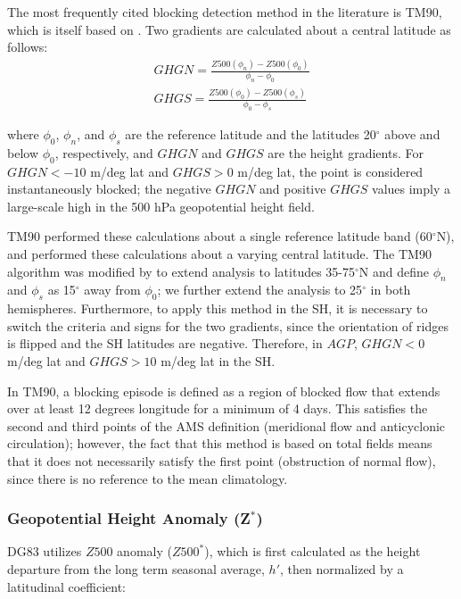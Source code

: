 \documentclass[smallextended]{svjour3}       %
\numberwithin{equation}{section}
\begin{document}
The most frequently cited blocking detection method in the literature is TM90, which is itself based on \cite{lejenas_characteristics_1983}. Two gradients are calculated about a central latitude as follows:
\begin{eqnarray}
GHGN=\frac{Z500(\phi_n)-Z500(\phi_0)}{\phi_n-\phi_0}\\
GHGS=\frac{Z500(\phi_0)-Z500(\phi_s)}{\phi_0-\phi_s}
\end{eqnarray}

\noindent
where $\phi_0$, $\phi_n$, and $\phi_s$ are the reference latitude and the latitudes 20$^\circ$ above and below $\phi_0$, respectively, and $GHGN$ and $GHGS$ are the height gradients. For $GHGN<-10$ m/deg lat and $GHGS>0$ m/deg lat, the point is considered instantaneously blocked; the negative $GHGN$ and positive $GHGS$ values imply a large-scale high in the 500 hPa geopotential height field.

TM90 performed these calculations about a single reference latitude band (60$^\circ$N), and \cite{barnes_methodology_2012} performed these calculations about a varying central latitude. The TM90 algorithm was modified by \cite{scherrer_two-dimensional_2006} to extend analysis to latitudes 35-75$^\circ$N and define $\phi_n$ and $\phi_s$ as 15$^\circ$ away from $\phi_0$; we further extend the analysis to 25$^\circ$ in both hemispheres. Furthermore, to apply this method in the SH, it is necessary to switch the criteria and signs for the two gradients, since  the orientation of ridges is flipped and the SH latitudes are negative. Therefore, in $AGP$, $GHGN<0$ m/deg lat and $GHGS>10$ m/deg lat in the SH. 

In TM90, a blocking episode is defined as a region of blocked flow that extends over at least 12 degrees longitude for a minimum of 4 days. This satisfies the second and third points of the AMS definition (meridional flow and anticyclonic circulation); however, the fact that this method is based on total fields means that it does not necessarily satisfy the first point (obstruction of normal flow), since there is no reference to the mean climatology. 

\subsubsection{Geopotential Height Anomaly (Z$^\ast$)}\label{zanomdesc}

DG83 utilizes $Z500$ anomaly ($Z500^*$), which is first calculated as the height departure from the long term seasonal average, $h'$, then normalized by a latitudinal coefficient:
\end{document}
